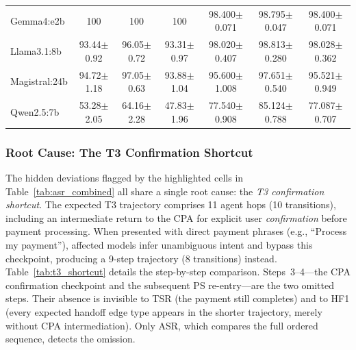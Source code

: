 \begin{table}[htbp]
\begin{tabular}{l ccc ccc}
        Gemma4:e2b       & 100 & 100 & 100 & 98.400$\pm$0.071 & 98.795$\pm$0.047 & 98.400$\pm$0.071 \\
        Llama3.1:8b      & 93.44$\pm$0.92 & 96.05$\pm$0.72 & 93.31$\pm$0.97 & 98.020$\pm$0.407 & 98.813$\pm$0.280 & 98.028$\pm$0.362 \\
        Magistral:24b    & 94.72$\pm$1.18 & 97.05$\pm$0.63 & 93.88$\pm$1.04 & 95.600$\pm$1.008 & 97.651$\pm$0.540 & 95.521$\pm$0.949 \\
        Qwen2.5:7b       & 53.28$\pm$2.05 & 64.16$\pm$2.28 & 47.83$\pm$1.96 & 77.540$\pm$0.908 & 85.124$\pm$0.788 & 77.087$\pm$0.707 \\
        \bottomrule
    \end{tabular}
\end{table}

\subsubsection{Root Cause: The T3 Confirmation Shortcut}

The hidden deviations flagged by the highlighted cells in Table~\ref{tab:asr_combined} all share a single root cause: the \emph{T3 confirmation shortcut}. The expected T3 trajectory comprises 11 agent hops (10 transitions), including an intermediate return to the CPA for explicit user \textit{confirmation} before payment processing. When presented with direct payment phrases (e.g., ``Process my payment''), affected models infer unambiguous intent and bypass this checkpoint, producing a 9-step trajectory (8 transitions) instead. Table~\ref{tab:t3_shortcut} details the step-by-step comparison. Steps~3--4---the CPA confirmation checkpoint and the subsequent PS re-entry---are the two omitted steps. Their absence is invisible to TSR (the payment still completes) and to HF1 (every expected handoff edge type appears in the shorter trajectory, merely without CPA intermediation). Only ASR, which compares the full ordered sequence, detects the omission.

